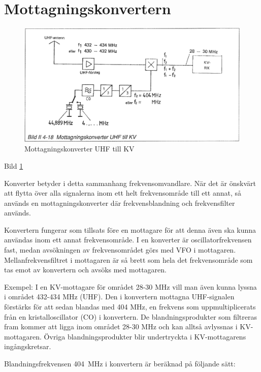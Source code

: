 \section{Mottagningskonvertern}

\begin{figure}
  \includegraphics[width=\textwidth]{images/bild_2_4-18}
  \caption{Mottagningskonverter UHF till KV}
  \label{fig:bildII4-18}
\end{figure}

Bild \ref{fig:bildII4-18}

Konverter betyder i detta sammanhang frekvensomvandlare. När det är
önskvärt att flytta över alla signalerna inom ett helt frekvensområde
till ett annat, så används en mottagningskonverter där
frekvensblandning och frekvensfilter används.

Konvertern fungerar som tillsats före en mottagare för att denna även
ska kunna användas inom ett annat frekvensområde. I en konverter är
oscillatorfrekvensen fast, medan avsökningen av frekvensområdet görs
med VFO i mottagaren. Mellanfrekvensfiltret i mottagaren är så brett
som hela det frekvensområde som tas emot av konvertern och avsöks med
mottagaren.

Exempel: I en KV-mottagare för området 28-30 MHz vill man även kunna
lyssna i området 432-434 MHz (UHF). Den i konvertern mottagna
UHF-signalen förstärks för att sedan blandas med 404 MHz, en frekvens
som uppmultiplicerats från en kristalloscillator (CO) i konvertern. De
blandningsprodukter som filtreras fram kommer att ligga inom området
28-30 MHz och kan alltså avlyssnas i KV-mottagaren. Övriga
blandningsprodukter blir undertryckta i KV-mottagarens ingångskretsar.

Blandningsfrekvensen 404~MHz i konvertern är beräknad på följande sätt:

